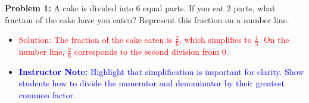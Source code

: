 \documentclass[12pt]{article}
\begin{document}
\begin{tcolorbox}[colframe=black!60, colback=white, 
coltitle=black, colbacktitle=black!15, fonttitle=\bfseries\Large, 
title=Guided Practice with Solutions (Problem 1), halign title=center, left=10pt, right=10pt, top=10pt, bottom=5pt]

\textbf{Problem 1:} A cake is divided into 6 equal parts. If you eat 2 parts, what fraction of the cake have you eaten? Represent this fraction on a number line.
\begin{center}
\end{center}
\begin{itemize}
    \item \textcolor{red}{Solution: The fraction of the cake eaten is \( \frac{2}{6} \), which simplifies to \( \frac{1}{3} \). On the number line, \( \frac{2}{6} \) corresponds to the second division from 0.}
    \item \textcolor{blue}{\textbf{Instructor Note:} Highlight that simplification is important for clarity. Show students how to divide the numerator and denominator by their greatest common factor.}
\end{itemize}

\end{tcolorbox}
\end{document}
